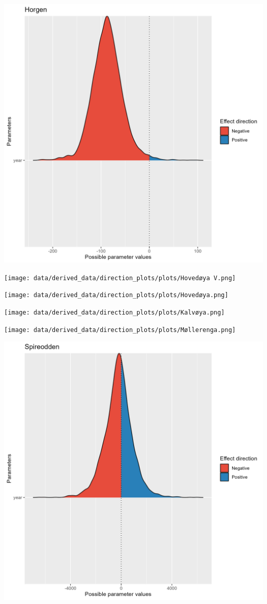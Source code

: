\documentclass[
  letterpaper,
  DIV=11,
  numbers=noendperiod]{scrreport}
\begin{document}
\includegraphics{data/derived_data/direction_plots/plots/Horgen.png}

\texttt{[image: data/derived\_data/direction\_plots/plots/Hovedøya V.png]}

\texttt{[image: data/derived\_data/direction\_plots/plots/Hovedøya.png]}

\texttt{[image: data/derived\_data/direction\_plots/plots/Kalvøya.png]}

\texttt{[image: data/derived\_data/direction\_plots/plots/Møllerenga.png]}

\includegraphics{data/derived_data/direction_plots/plots/Spireodden.png}
\end{document}
